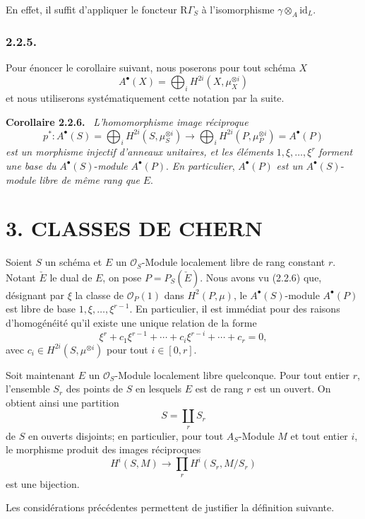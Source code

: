 \documentclass[11pt]{article}
\newenvironment{statement}[1]{\par\medskip\noindent\textbf{#1.}\ }{\par\medskip}
\newcommand{\R}{\mathrm{R}}\newcommand{\RHomCore}{\mathrm{RHom}}
\providecommand{\R}{\mathrm R}
\begin{document}
En effet, il suffit d'appliquer le foncteur $\R\Gamma_S$ à l'isomorphisme $\gamma\otimes_A\mathrm{id}_L$.

\subsubsection*{2.2.5.}
Pour énoncer le corollaire suivant, nous poserons pour tout schéma $X$
\[
A^\bullet(X)=\bigoplus_i H^{2i}(X,\mu_X^{\otimes i})
\]
et nous utiliserons systématiquement cette notation par la suite.

\begin{statement}{Corollaire 2.2.6}
\emph{L'homomorphisme image réciproque}
\[
p^*:A^\bullet(S)=\bigoplus_i H^{2i}(S,\mu_S^{\otimes i})
\longrightarrow
\bigoplus_i H^{2i}(P,\mu_P^{\otimes i})=A^\bullet(P)
\]
\emph{est un morphisme injectif d'anneaux unitaires, et les éléments} $1,\xi,\ldots,\xi^r$ \emph{forment une base du} $A^\bullet(S)$-\emph{module} $A^\bullet(P)$. \emph{En particulier}, $A^\bullet(P)$ \emph{est un} $A^\bullet(S)$-\emph{module libre de même rang que} $E$.
\end{statement}

\section*{3. CLASSES DE CHERN}

Soient $S$ un schéma et $E$ un $\mathcal O_S$-Module localement libre de rang constant $r$. Notant $\check E$ le dual de $E$, on pose $P=P_S(\check E)$. Nous avons vu (2.2.6) que, désignant par $\xi$ la classe de $\mathcal O_P(1)$ dans $H^2(P,\mu)$, le $A^\bullet(S)$-module $A^\bullet(P)$ est libre de base $1,\xi,\ldots,\xi^{r-1}$. En particulier, il est immédiat pour des raisons d'homogénéité qu'il existe une unique relation de la forme
\[
\xi^r+c_1\xi^{r-1}+\cdots+c_i\xi^{r-i}+\cdots+c_r=0,
\tag*{3.1.}
\]
avec $c_i\in H^{2i}(S,\mu^{\otimes i})$ pour tout $i\in[0,r]$.

Soit maintenant $E$ un $\mathcal O_S$-Module localement libre quelconque. Pour tout entier $r$, l'ensemble $S_r$ des points de $S$ en lesquels $E$ est de rang $r$ est un ouvert. On obtient ainsi une partition
\[
S=\coprod_r S_r
\]
de $S$ en ouverts disjoints; en particulier, pour tout $A_S$-Module $M$ et tout entier $i$, le morphisme produit des images réciproques
\[
H^i(S,M)\longrightarrow \prod_r H^i(S_r,M/S_r)
\]
est une bijection.

Les considérations précédentes permettent de justifier la définition suivante.
\end{document}
